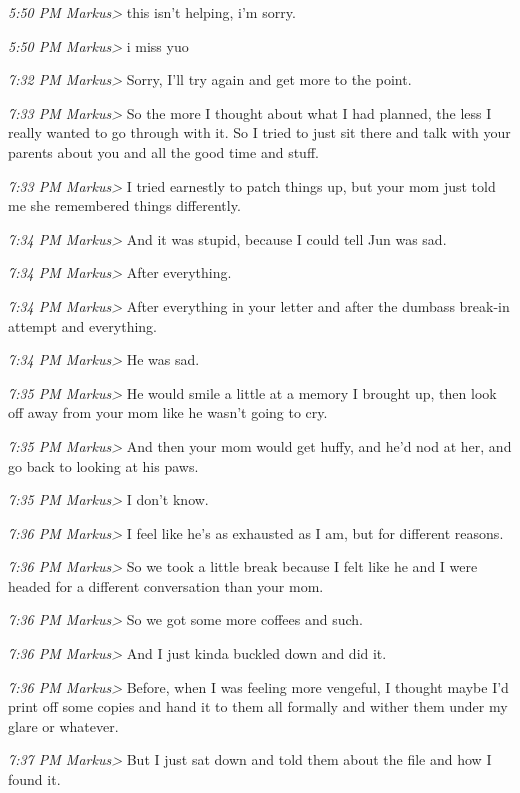 {\emph{5:50 PM Markus\textgreater{}} this isn't helping, i'm sorry.

\emph{5:50 PM Markus\textgreater{}} i miss yuo

\emph{7:32 PM Markus\textgreater{}} Sorry, I'll try again and get more
to the point.

\emph{7:33 PM Markus\textgreater{}} So the more I thought about what I
had planned, the less I really wanted to go through with it. So I tried
to just sit there and talk with your parents about you and all the good
time and stuff.

\emph{7:33 PM Markus\textgreater{}} I tried earnestly to patch things
up, but your mom just told me she remembered things differently.

\emph{7:34 PM Markus\textgreater{}} And it was stupid, because I could
tell Jun was sad.

\emph{7:34 PM Markus\textgreater{}} After everything.

\emph{7:34 PM Markus\textgreater{}} After everything in your letter and
after the dumbass break-in attempt and everything.

\emph{7:34 PM Markus\textgreater{}} He was sad.

\emph{7:35 PM Markus\textgreater{}} He would smile a little at a memory
I brought up, then look off away from your mom like he wasn't going to
cry.

\emph{7:35 PM Markus\textgreater{}} And then your mom would get huffy,
and he'd nod at her, and go back to looking at his paws.

\emph{7:35 PM Markus\textgreater{}} I don't know.

\emph{7:36 PM Markus\textgreater{}} I feel like he's as exhausted as I
am, but for different reasons.

\emph{7:36 PM Markus\textgreater{}} So we took a little break because I
felt like he and I were headed for a different conversation than your
mom.

\emph{7:36 PM Markus\textgreater{}} So we got some more coffees and
such.

\emph{7:36 PM Markus\textgreater{}} And I just kinda buckled down and
did it.

\emph{7:36 PM Markus\textgreater{}} Before, when I was feeling more
vengeful, I thought maybe I'd print off some copies and hand it to them
all formally and wither them under my glare or whatever.

\emph{7:37 PM Markus\textgreater{}} But I just sat down and told them
about the file and how I found it.

}
